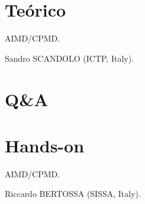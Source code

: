 \section{Teórico}

   AIMD/CPMD.

  	Sandro SCANDOLO (ICTP, Italy).

\section{Q\&A}

\section{Hands-on}

   AIMD/CPMD.

   Riccardo BERTOSSA (SISSA, Italy).
